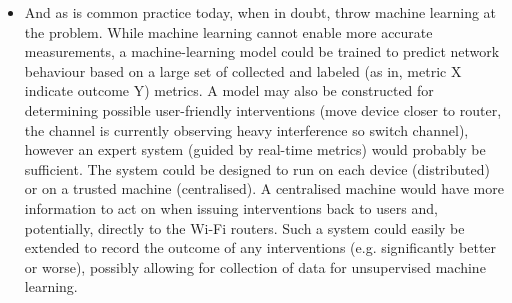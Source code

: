 \begin{itemize}
\item And as is common practice today, when in doubt, throw machine learning
at the problem. While machine learning cannot enable more accurate
measurements, a machine-learning model could be trained to predict network
behaviour based on a large set of collected and labeled (as in, metric X
indicate outcome Y) metrics. A model may also be constructed for determining
possible user-friendly interventions (move device closer to router, the
channel is currently observing heavy interference so switch channel), however
an expert system (guided by real-time metrics) would probably be sufficient.
The system could be designed to run on each device (distributed) or on a
trusted machine (centralised). A centralised machine would have more
information to act on when issuing interventions back to users and,
potentially, directly to the Wi-Fi routers. Such a system could easily be
extended to record the outcome of any interventions (e.g. significantly
better or worse), possibly allowing for collection of data for unsupervised
machine learning.

\end{itemize}
